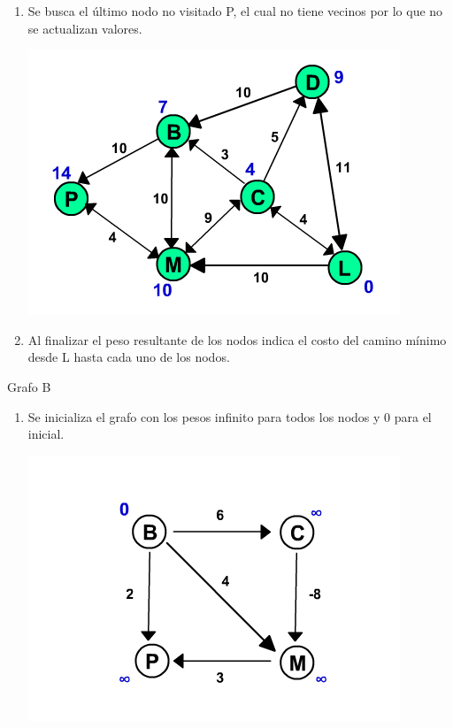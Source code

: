 \documentclass[dcc,sol]{fcfmcourse}
\begin{document}
\begin{problems}
\begin{enumerate}[1.]
\newpage
\item Se busca el último nodo no visitado P, el cual no tiene vecinos por lo que no se actualizan valores.
\begin{center}
\includegraphics[scale=0.65]{dijkstra0007.png}
\end{center}

\item Al finalizar el peso resultante de los nodos indica el costo del camino mínimo desde L hasta cada uno de los nodos.

\end{enumerate}

Grafo B

\begin{enumerate}[1.]

\item Se inicializa el grafo con los pesos infinito para todos los nodos y 0 para el inicial.
\begin{center}
\includegraphics[scale=0.65]{dijkstra0008.png}
\end{center}


\end{enumerate}
\end{problems}
\end{document}
